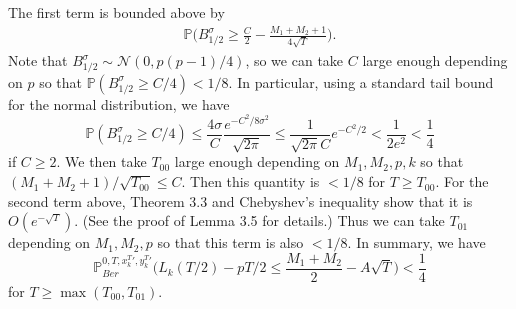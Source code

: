 \documentclass[12pt]{article}
\begin{document}
	The first term is bounded above by
	\begin{align*}
	\mathbb{P} \Big( B^{\sigma}_{1/2} \geq  \frac{C}{2} - \frac{M_1 + M_2 + 1}{4\sqrt{T}}\Big).
	\end{align*}
	Note that $B_{1/2}^{\sigma}\sim\mathcal{N}(0,p(p-1)/4)$, so we can take $C$ large enough depending on $p$ so that $\mathbb{P}(B_{1/2}^{\sigma} \geq C/4) < 1/8$. In particular, using a standard tail bound for the normal distribution, we have
	\[
	\mathbb{P}(B_{1/2}^{\sigma} \geq C/4) \leq \frac{4\sigma}{C}\frac{e^{-C^2/8\sigma^2}}{\sqrt{2\pi}} \leq \frac{1}{\sqrt{2\pi}C}e^{-C^2/2} < \frac{1}{2e^2} < \frac{1}{4}
	\]
	if $C\geq 2$. We then take $T_{00}$ large enough depending on $M_1,M_2,p,k$ so that $(M_1+M_2+1)/\sqrt{T_{00}}\leq C$. Then this quantity is $<1/8$ for $T\geq T_{00}$. For the second term above, Theorem 3.3 and Chebyshev's inequality show that it is $O(e^{-\sqrt{T}})$. (See the proof of Lemma 3.5 for details.) Thus we can take $T_{01}$ depending on $M_1,M_2,p$ so that this term is also $<1/8$. In summary, we have
	\[
	\mathbb{P}^{0,T,x_k^T{}',y_k^T{}'}_{Ber} \Big( L_k(T/2) - pT/2 \leq \frac{M_1+M_2}{2} - A\sqrt{T} \Big) < \frac{1}{4}
	\]
	for $T\geq\max(T_{00},T_{01})$.
	
\end{document}

